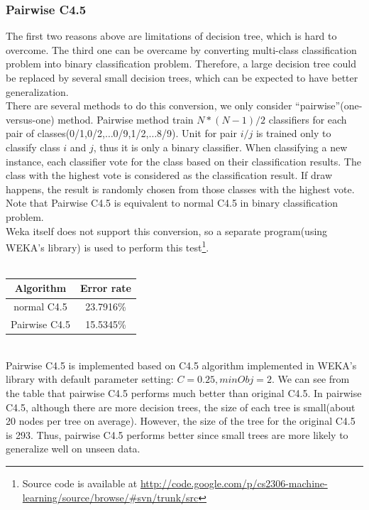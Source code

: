 \documentclass[a4paper,11pt]{nurop}
\begin{document}
\subsubsection{Pairwise C4.5}
The first two reasons above are limitations of decision tree, which is hard to overcome. The third one can be overcame by converting multi-class classification problem into binary classification problem. Therefore, a large decision tree could be replaced by several small decision trees, which can be expected to have better generalization.\\
There are several methods to do this conversion, we only consider ``pairwise''(one-versus-one) method. Pairwise method train $N*(N-1)/2$ classifiers for each pair of classes(0/1,0/2,$\ldots$0/9,1/2,$\ldots$8/9). Unit for pair $i/j$ is trained only to classify class $i$ and $j$, thus it is only a binary classifier. When classifying a new instance, each classifier vote for the class based on their classification results. The class with the highest vote is considered as the classification result. If draw happens, the result is randomly chosen from those classes with the highest vote. Note that Pairwise C4.5 is equivalent to normal C4.5 in binary classification problem.\\
Weka itself does not support this conversion, so a separate program(using WEKA's library) is used to perform this test\footnote{Source code is available at \url{http://code.google.com/p/cs2306-machine-learning/source/browse/#svn/trunk/src}}.\\
\vspace{0.5cm}\\
\begin{tabular}{c c}
Algorithm	& Error rate\\
\hline \hline
normal C4.5	& 23.7916\%\\
Pairwise C4.5	& 15.5345\%\\
\end{tabular}
\vspace{0.5cm}\\
Pairwise C4.5 is implemented based on C4.5 algorithm implemented in WEKA's library with default parameter setting: $C=0.25,minObj=2$. We can see from the table that pairwise C4.5 performs much better than original C4.5. In pairwise C4.5, although there are more decision trees, the size of each tree is small(about 20 nodes per tree on average). However, the size of the tree for the original C4.5 is 293. Thus, pairwise C4.5 performs better since small trees are more likely to generalize well on unseen data.
\end{document}
